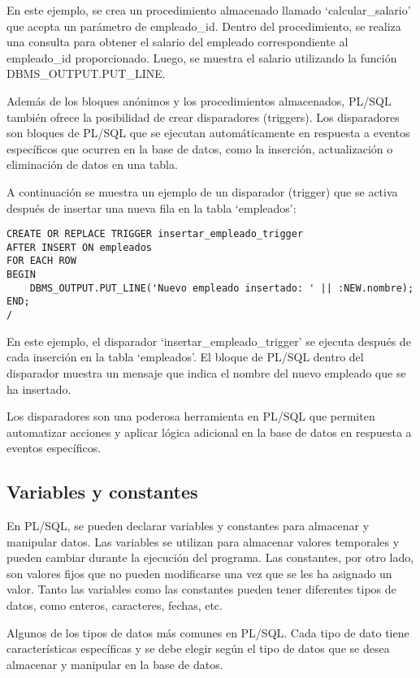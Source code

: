 \documentclass[executivepaper]{article}
\begin{document}
En este ejemplo, se crea un procedimiento almacenado llamado \enquote*{calcular\_salario} que acepta un parámetro de empleado\_id. Dentro del procedimiento, se realiza una consulta para obtener el salario del empleado correspondiente al empleado\_id proporcionado. Luego, se muestra el salario utilizando la función DBMS\_OUTPUT.PUT\_LINE.

Además de los bloques anónimos y los procedimientos almacenados, PL/SQL también ofrece la posibilidad de crear disparadores (triggers). Los disparadores son bloques de PL/SQL que se ejecutan automáticamente en respuesta a eventos específicos que ocurren en la base de datos, como la inserción, actualización o eliminación de datos en una tabla.

A continuación se muestra un ejemplo de un disparador (trigger) que se activa después de insertar una nueva fila en la tabla \enquote*{empleados}:

\begin{lstlisting}
CREATE OR REPLACE TRIGGER insertar_empleado_trigger
AFTER INSERT ON empleados
FOR EACH ROW
BEGIN
    DBMS_OUTPUT.PUT_LINE('Nuevo empleado insertado: ' || :NEW.nombre);
END;
/
\end{lstlisting}

En este ejemplo, el disparador \enquote*{insertar\_empleado\_trigger} se ejecuta después de cada inserción en la tabla \enquote*{empleados}. El bloque de PL/SQL dentro del disparador muestra un mensaje que indica el nombre del nuevo empleado que se ha insertado.

Los disparadores son una poderosa herramienta en PL/SQL que permiten automatizar acciones y aplicar lógica adicional en la base de datos en respuesta a eventos específicos.

\subsection{Variables y constantes}
En PL/SQL, se pueden declarar variables y constantes para almacenar y manipular datos. Las variables se utilizan para almacenar valores temporales y pueden cambiar durante la ejecución del programa. Las constantes, por otro lado, son valores fijos que no pueden modificarse una vez que se les ha asignado un valor. Tanto las variables como las constantes pueden tener diferentes tipos de datos, como enteros, caracteres, fechas, etc.

Algunos de los tipos de datos más comunes en PL/SQL. Cada tipo de dato tiene características específicas y se debe elegir según el tipo de datos que se desea almacenar y manipular en la base de datos.
\end{document}
